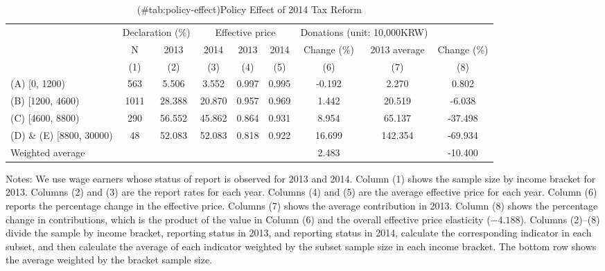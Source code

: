 \begin{table}

\caption{(\#tab:policy-effect)Policy Effect of 2014 Tax Reform}
\centering
\fontsize{8}{10}\selectfont
\begin{threeparttable}
\begin{tabular}[t]{>{\raggedright\arraybackslash}p{10em}cccccccc}
\toprule
\multicolumn{2}{c}{ } & \multicolumn{2}{c}{Declaration (\%)} & \multicolumn{3}{c}{Effective price} & \multicolumn{2}{c}{Donations (unit: 10,000KRW)} \\
\cmidrule(l{3pt}r{3pt}){3-4} \cmidrule(l{3pt}r{3pt}){5-7} \cmidrule(l{3pt}r{3pt}){8-9}
\multicolumn{1}{c}{2013 Income bracket} & \multicolumn{1}{c}{N} & \multicolumn{1}{c}{2013} & \multicolumn{1}{c}{2014} & \multicolumn{1}{c}{2013} & \multicolumn{1}{c}{2014} & \multicolumn{1}{c}{Change (\%)} & \multicolumn{1}{c}{2013 average} & \multicolumn{1}{c}{Change (\%)} \\
\cmidrule(l{3pt}r{3pt}){1-1} \cmidrule(l{3pt}r{3pt}){2-2} \cmidrule(l{3pt}r{3pt}){3-3} \cmidrule(l{3pt}r{3pt}){4-4} \cmidrule(l{3pt}r{3pt}){5-5} \cmidrule(l{3pt}r{3pt}){6-6} \cmidrule(l{3pt}r{3pt}){7-7} \cmidrule(l{3pt}r{3pt}){8-8} \cmidrule(l{3pt}r{3pt}){9-9}
 & (1) & (2) & (3) & (4) & (5) & (6) & (7) & (8)\\
\midrule
(A) [0, 1200) & 563 & 5.506 & 3.552 & 0.997 & 0.995 & -0.192 & 2.270 & 0.802\\
(B) [1200, 4600) & 1011 & 28.388 & 20.870 & 0.957 & 0.969 & 1.442 & 20.519 & -6.038\\
(C) [4600, 8800) & 290 & 56.552 & 45.862 & 0.864 & 0.931 & 8.954 & 65.137 & -37.498\\
(D) \& (E) [8800, 30000) & 48 & 52.083 & 52.083 & 0.818 & 0.922 & 16.699 & 142.354 & -69.934\\
Weighted average &  &  &  &  &  & 2.483 &  & -10.400\\
\bottomrule
\end{tabular}
\begin{tablenotes}
\item Notes: We use wage earners whose status of report is observed for 2013 and 2014. Column (1) shows the sample size by income bracket for 2013. Columns (2) and (3) are the report rates for each year. Columns (4) and (5) are the average effective price for each year. Column (6) reports the percentage change in the effective price. Columns (7) shows the average contribution in 2013. Column (8) shows the percentage change in contributions, which is the product of the value in Column (6) and the overall effective price elasticity ($-4.188$). Columns (2)--(8) divide the sample by income bracket, reporting status in 2013, and reporting status in 2014, calculate the corresponding indicator in each subset, and then calculate the average of each indicator weighted by the subset sample size in each income bracket. The bottom row shows the average weighted by the bracket sample size.
\end{tablenotes}
\end{threeparttable}
\end{table}
